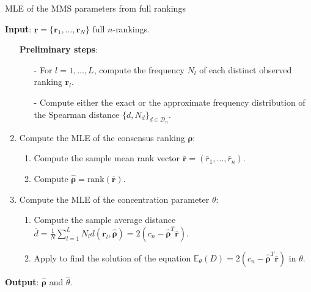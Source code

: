 \begin{algorithm}[h]\small
\caption{MLE of the MMS parameters from full rankings}
\label{alg:full}
\hspace*{\algorithmicindent} \textbf{Input}: $\underline{\bm{r}}=\{\bm{r}_1,\dots,\bm{r}_N\}$ full $n$-rankings.
\begin{enumerate}
    \item[] \textbf{Preliminary steps}: 
\begin{itemize}
    \item[-] For $l=1,\dots,L$, compute the frequency $N_l$ of each distinct observed ranking $\bm{r}_l$.
    \item[-] Compute either the exact or the
approximate frequency distribution of the Spearman distance $\{d,N_d\}_{d\in\mathcal{D}_n}$.
    \end{itemize}
    \item Compute the MLE of the consensus ranking $\bm\rho$:
    \begin{enumerate}
        \item Compute the sample mean rank vector ${\bm{\bar r}}=(\bar{r}_1,\ldots,\bar{r}_n)$. 
        \item Compute $\hat{\bm{\rho}}=\text{rank}({\bm{\bar r}})$.
    \end{enumerate}
    \item Compute the MLE of the concentration parameter $\theta$:
    \begin{enumerate}
        \item  Compute the sample average distance $\bar d=\frac{1}{N}\sum_{l=1}^LN_ld(\bm{r}_l,\hat{\bm{\rho}})=2(c_n-\hat{\bm{\rho}}^T{\bm{\bar r}})$.
        \item  Apply  to find the solution of the equation $\mathbb{E}_{\theta}(D) = 2(c_n-\hat{\bm{\rho}}^T{\bm{\bar r}})$ in $\theta$.
    \end{enumerate}
\end{enumerate}
    \hspace*{\algorithmicindent} \textbf{Output}: $\hat{\bm{\rho}}$ and $\hat{\theta}$. 
\end{algorithm}


